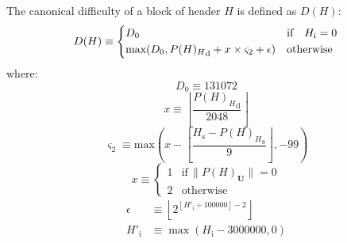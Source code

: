 \documentclass[9pt,oneside]{amsart}
\makeatletter
\newcommand{\linkdest}[1]{\Hy@raisedlink{\hypertarget{#1}{}}}
\makeatother
\begin{document}
\begin{multicols}{2}
\newcommand{\mindifficulty}{D_0}
\newcommand{\homesteadmod}{\ensuremath{\varsigma_2}}
\newcommand{\expdiffsymb}{\ensuremath{\epsilon}}
\newcommand{\diffadjustment}{x}

\hypertarget{block_difficulty_H__d}{}\linkdest{H__d}The canonical difficulty of a block of header $H$ is defined as $D(H)$:
\begin{equation}
D(H) \equiv \begin{dcases}
\mindifficulty & \text{if} \quad H_{\mathrm{i}} = 0\\
\text{max}\!\left(\mindifficulty, {P(H)_{H}}_{\mathrm{d}} + \diffadjustment\times\homesteadmod + \expdiffsymb \right) & \text{otherwise}\\
\end{dcases}
\end{equation}
where:
\begin{equation}
\mindifficulty \equiv 131072
\end{equation}
\begin{equation}
\diffadjustment \equiv \left\lfloor\frac{{P(H)_{H}}_{\mathrm{d}}}{2048}\right\rfloor
\end{equation}
\begin{equation}
\homesteadmod \equiv \text{max}\left( x - \left\lfloor\frac{H_{\mathrm{s}} - {P(H)_{H}}_{\mathrm{s}}}{9}\right\rfloor, -99 \right)
\end{equation}
\begin{equation*}
x \equiv \begin{cases}
1 & \text{if} \, \lVert P(H)_{\mathbf{U}}\rVert = 0 \\
2 & \text{otherwise}
\end{cases}
\end{equation*}
\begin{align}
\expdiffsymb &\equiv \left\lfloor 2^{ \left\lfloor H'_{\mathrm{i}} \div 100000 \right\rfloor - 2 } \right\rfloor \\
H'_{\mathrm{i}} &\equiv \max(H_{\mathrm{i}} - 3000000, 0)
\end{align}


\end{multicols}
\end{document}
